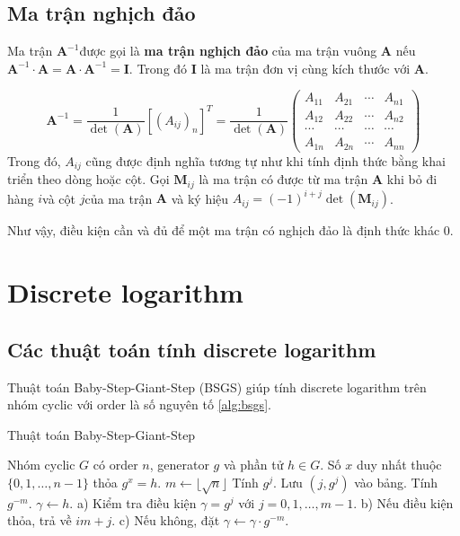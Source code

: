 \documentclass{mynotes}
\begin{document}
\section{Ma trận nghịch đảo}

Ma trận $\bm{A}^{-1}$​ được gọi là \textbf{ma trận nghịch đảo} của ma trận vuông $\bm{A}$ nếu $\bm{A}^{-1} \cdot \bm{A} = \bm{A} \cdot \bm{A}^{-1} = \bm{I}$​. Trong đó $\bm{I}$ là ma trận đơn vị cùng kích thước với $\bm{A}$.

\begin{equation}
    \bm{A}^{-1}=\frac{1}{\det(\bm{A})}[(A_{ij})_n]^T=\frac{1}{\det(\bm{A})}\begin{pmatrix} A_{11} & A_{21} & \cdots & A_{n1} \\ A_{12} & A_{22} & \cdots & A_{n2} \\ \cdots & \cdots & \cdots & \cdots \\ A_{1n} & A_{2n} & \cdots & A_{nn} \end{pmatrix}
\end{equation}
Trong đó, $A_{ij}$ cũng được định nghĩa tương tự như khi tính định thức bằng khai triển theo dòng hoặc cột. Gọi $\bm{M}_{ij}$ là ma trận có được từ ma trận $\bm{A}$ khi bỏ đi hàng $i$​ và cột $j$​ của ma trận $\bm{A}$ và ký hiệu $A_{ij}=(-1)^{i+j} \det (\bm{M}_{ij})$.

Như vậy, điều kiện cần và đủ để một ma trận có nghịch đảo là định thức khác 0.

\chapter{Discrete logarithm}

\section{Các thuật toán tính discrete logarithm}

Thuật toán Baby-Step-Giant-Step (BSGS) giúp tính discrete logarithm trên nhóm cyclic với order là số nguyên tố \ref{alg:bsgs}.

\begin{algorithm}[H]
    \caption{Thuật toán Baby-Step-Giant-Step}
    \label{alg:bsgs}
    \begin{algorithmic}[1]
        \Require Nhóm cyclic $G$ có order $n$, generator $g$ và phần tử $h \in G$.
        \Ensure Số $x$ duy nhất thuộc $\{ 0, 1, \ldots, n-1 \}$ thỏa $g^x = h$.
        $m \gets \lfloor \sqrt{n} \rfloor$
            \State Tính $g^j$. Lưu $(j, g^j)$ vào bảng.
        \EndFor
        \State Tính $g^{-m}$.
        \State $\gamma \gets h$.
            \State a) Kiểm tra điều kiện $\gamma = g^j$ với $j = 0, 1, \ldots, m-1$.
            \State b) Nếu điều kiện thỏa, trả về $im + j$.
            \State c) Nếu không, đặt $\gamma \gets \gamma \cdot g^{-m}$.
        \EndFor
    \end{algorithmic}
\end{algorithm}
\end{document}
